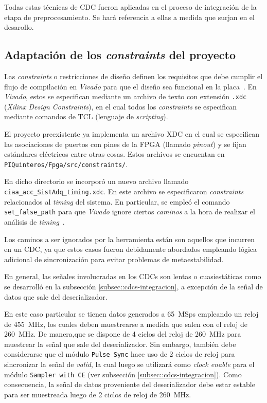 \documentclass[../../main.tex]{subfiles}
\begin{document}
Todas estas técnicas de CDC fueron aplicadas en el proceso de integración de la etapa de preprocesamiento. Se hará referencia a ellas a medida que surjan en el desarollo.



\subsection{Adaptación de los \textit{constraints} del proyecto}
Las \textit{constraints} o restricciones de diseño definen los requisitos que debe cumplir el flujo de compilación en \textit{Vivado} para que el diseño sea funcional en la placa~\cite{xdc-constraints}. En \textit{Vivado}, estos se especifican mediante un archivo de texto con extensión \texttt{.xdc} (\textit{Xilinx Design Constraints}), en el cual todos los \textit{constraints} se especifican mediante comandos de TCL (lenguaje de \textit{scripting}).

El proyecto preexistente ya implementa un archivo XDC en el cual se especifican las asociaciones de puertos con pines de la FPGA (llamado \textit{pinout}) y se fijan estándares eléctricos entre otras cosas. Estos archivos se encuentan en \texttt{PIQuinteros/Fpga/src/constraints/}.

En dicho directorio se incorporó un nuevo archivo llamado \texttt{ciaa\_acc\_SistAdq\_timing.xdc}. En este archivo se especificaron \textit{constraints} relacionados al \textit{timing} del sistema. En particular, se empleó el comando \texttt{set\_false\_path} para que \textit{Vivado} ignore ciertos \textit{caminos} a la hora de realizar el análisis de \textit{timing}~\cite{false-paths}.

Los caminos a ser ignorados por la herramienta están son aquellos que incurren en un CDC, ya que estos casos fueron debidamente abordados empleando lógica adicional de sincronización para evitar problemas de metaestabilidad. 

En general, las señales involucradas en los CDCs son lentas o cuasiestáticas como se desarrolló en la subsección \ref{subsec::cdcs-integracion}, a excepción de la señal de datos que sale del deserializador. 

En este caso particular se tienen datos generados a 65~MSps empleando un reloj de 455~MHz, los cuales deben muestrearse a medida que salen con el reloj de 260~MHz. De manera,que se dispone de 4 ciclos del reloj de 260~MHz para muestrear la señal que sale del deserializador. Sin embargo, también debe considerarse que el módulo \texttt{Pulse Sync} hace uso de 2 ciclos de reloj para sincronizar la señal de \textit{valid}, la cual luego se utilizará como \textit{clock enable} para el módulo \texttt{Sampler with CE} (ver subsección \ref{subsec::cdcs-integracion}). Como consecuencia, la señal de datos proveniente del deserializador debe estar estable para ser muestreada luego de 2 ciclos de reloj de 260~MHz.
\end{document}
